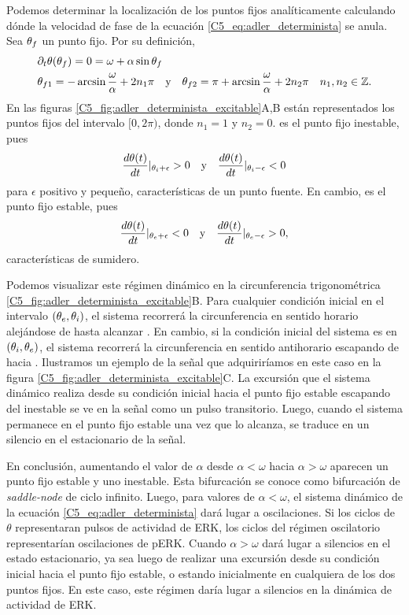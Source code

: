 \documentclass[./main.tex]{subfiles}
\begin{document}
Podemos determinar la localización de los puntos fijos analíticamente calculando dónde la velocidad de fase de la ecuación \ref{C5_eq:adler_determinista} se anula. Sea $\theta_f$ un punto fijo. Por su definición,  
\begin{align}
    &\partial_t \theta (\xx_f) = 0 = \omega + \alpha \sin{\xx_f} \nonumber \\
    &\xx_{f1} = -\arcsin{\frac{\omega}{\alpha}} + 2 n_1 \pi \quad \text{y} \quad
     \xx_{f2} = \pi + \arcsin{\frac{\omega}{\alpha}} + 2 n_2  \pi \quad n_1,n_2 \in \mathbb{Z}. 
    \label{C5_eq:PF_def}
\end{align}
En las figuras \ref{C5_fig:adler_determinista_excitable}A,B están representados los puntos fijos del intervalo $[0,2\pi)$, donde $n_1 = 1$ y $n_2 = 0$. \xxi es el punto fijo inestable, pues 
\begin{align*}
    \frac{d\theta(t)}{dt}|_{\theta_i+\epsilon} > 0 \quad \text{y} \quad \frac{d\theta(t)}{dt}|_{\theta_i-\epsilon} < 0
\end{align*}
 para $\epsilon$ positivo y pequeño, características de un punto fuente. En cambio, \xxe es el punto fijo estable, pues
 \begin{align*}
    \frac{d\theta(t)}{dt}|_{\theta_e+\epsilon} < 0 \quad \text{y} \quad \frac{d\theta(t)}{dt}|_{\theta_e-\epsilon} > 0,
\end{align*}
características de sumidero.


Podemos visualizar este régimen dinámico en la circunferencia trigonométrica \ref{C5_fig:adler_determinista_excitable}B. Para cualquier condición inicial en el intervalo $(\theta_e,\theta_i)$, el sistema recorrerá la circunferencia en sentido horario alejándose de \xxi hasta alcanzar \xxe. En cambio, si la condición inicial del sistema es en $(\theta_i,\theta_e)$, el sistema recorrerá la circunferencia en sentido antihorario escapando de \xxi hacia \xxe. Ilustramos un ejemplo de la señal que adquiriríamos en este caso en la figura \ref{C5_fig:adler_determinista_excitable}C. La excursión que el sistema dinámico realiza desde su condición inicial hacia el punto fijo estable escapando del inestable se ve en la señal como un pulso transitorio. Luego, cuando el sistema permanece en el punto fijo estable una vez que lo alcanza, se traduce en un silencio en el estacionario de la señal.  


En conclusión, aumentando el valor de $\alpha$ desde $\alpha < \omega$ hacia $\alpha > \omega$ aparecen un punto fijo estable y uno inestable. Esta bifurcación se conoce como bifurcación de \textit{saddle-node} de ciclo infinito. Luego, para valores de $\alpha < \omega$, el sistema dinámico de la ecuación \ref{C5_eq:adler_determinista} dará lugar a oscilaciones. Si los ciclos de $\theta$ representaran pulsos de actividad de ERK, los ciclos del régimen oscilatorio representarían oscilaciones de pERK. Cuando $\alpha > \omega$ dará lugar a silencios en el estado estacionario, ya sea luego de realizar una excursión desde su condición inicial hacia el punto fijo estable, o estando inicialmente en cualquiera de los dos puntos fijos. En este caso, este régimen daría lugar a silencios en la dinámica de actividad de ERK. 
\end{document}
